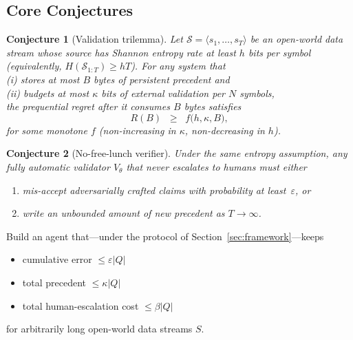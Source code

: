 \documentclass[11pt]{article}
\begin{document}
\subsection{Core Conjectures}
\label{sec:conjectures}

\newtheorem{conjecture}{Conjecture}
\begin{conjecture}[Validation trilemma]\label{conjecture1}
Let $\mathcal{S}=\langle s_1,\dots,s_T\rangle$ be an open-world data stream
whose source has Shannon entropy rate at least $h$ bits per symbol
(equivalently, $H(\mathcal S_{1:T})\ge hT$).
For any system that\\[0.1em]
\hspace*{1.5em}(i) stores at most $B$ bytes of persistent precedent and\\[0em]
\hspace*{1.5em}(ii) budgets at most $\kappa$ bits of external validation per $N$ symbols,\\
the prequential regret after it consumes $B$ bytes satisfies
\[
   R(B)\;\;\ge\;\;f\bigl(h,\kappa,B\bigr),
\]
for some monotone $f$ (non-increasing in $\kappa$, non-decreasing in $h$).
\end{conjecture}

\begin{conjecture}[No-free-lunch verifier]\label{conjecture2}
Under the same entropy assumption,
any fully automatic validator $V_\theta$ that never escalates to humans
must either
\begin{enumerate}[label=(\roman*)]
\item mis-accept adversarially crafted claims with probability at least~$\varepsilon$, or
\item write an unbounded amount of new precedent as $T\to\infty$.
\end{enumerate}
\end{conjecture}


\begin{tcolorbox}[title=Falsify-Us]
  Build an agent that—under the protocol of Section~\ref{sec:framework}—keeps
  \begin{itemize}
    \item cumulative error $\leq \varepsilon|Q|$
    \item total precedent $\leq \kappa|Q|$
    \item total human-escalation cost $\leq \beta|Q|$
  \end{itemize}
  for arbitrarily long open-world data streams $S$.
\end{tcolorbox}
\end{document}

